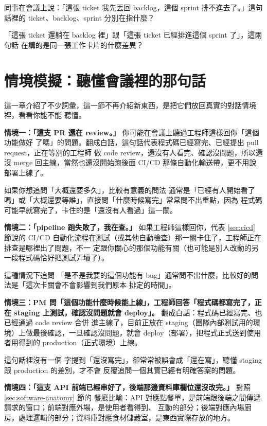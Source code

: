 \begin{drills}[label=drills:workplace-vocab]
\item 同事在會議上說：「這張 ticket 我先丟回 backlog，這個 sprint 排不進去了。」這句話裡的
ticket、backlog、sprint 分別在指什麼？
\item 「這張 ticket 還躺在 backlog 裡」跟「這張 ticket 已經排進這個 sprint 了」，這兩句話
在講的是同一張工作卡片的什麼差異？
\end{drills}

\section{情境模擬：聽懂會議裡的那句話}
\label{sec:workplace-scenarios}

這一章介紹了不少詞彙，這一節不再介紹新東西，是把它們放回真實的對話情境裡，看看你能不能
聽懂。

\textbf{情境一：「這支 PR 還在 review。」} 你可能在會議上聽過工程師這樣回你「這個功能做好
了嗎」的問題。翻成白話，這句話代表程式碼已經寫完、已經提出 pull request，正在等別的工程師
做 code review，還沒有人看完、確認沒問題，所以還沒 merge 回主線，當然也還沒開始跑後面
CI/CD 那條自動化輸送帶，更不用說部署上線了。

如果你想追問「大概還要多久」，比較有意義的問法
通常是「已經有人開始看了嗎」或「大概還要等誰」，直接問「什麼時候寫完」常常問不出重點，因為
程式碼可能早就寫完了，卡住的是「還沒有人看過」這一關。

\textbf{情境二：「pipeline 跑失敗了，我在查。」} 如果工程師這樣回你，代表 \ref{sec:cicd} 節說的
CI/CD 自動化流程在測試（或其他自動檢查）那一關卡住了，工程師正在排查是哪裡出了問題，不一
定跟你關心的那個功能有關（也可能是別人改動的另一段程式碼恰好把測試弄壞了）。

這種情況下追問
「是不是我要的這個功能有 bug」通常問不出什麼，比較好的問法是「這次卡關會不會影響到我們原本
排定的時間」。

\textbf{情境三：PM 問「這個功能什麼時候能上線」，工程師回答「程式碼都寫完了，正在 staging
上測試，確認沒問題就會 deploy」。} 翻成白話：程式碼已經寫完、也已經通過 code review 合併
進主線了，目前正放在 staging（團隊內部測試用的環境）上做最後確認，一旦確認沒問題，就會
deploy（部署），把程式正式送到使用者用得到的 production（正式環境）上線。

這句話裡沒有一個
字提到「還沒寫完」，卻常常被誤會成「還在寫」，聽懂 staging 跟 production 的差別，才不會
反覆追問一個其實已經有明確答案的問題。

\textbf{情境四：「這支 API 前端已經串好了，後端那邊資料庫欄位還沒改完。」} 對照 \ref{sec:software-anatomy} 節的
餐廳比喻：API 對應點餐單，是前端跟後端之間傳遞請求的窗口；前端對應外場，是使用者看得到、
互動的部分；後端對應內場廚房，處理邏輯的部分；資料庫對應食材儲藏室，是東西實際存放的地方。

